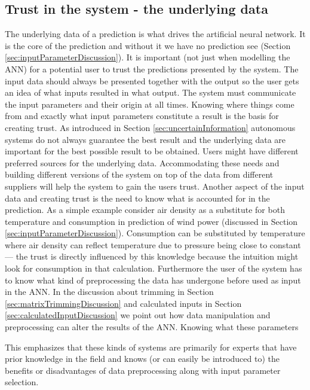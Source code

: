 \subsection{Trust in the system - the underlying data}
The underlying data of a prediction is what drives the artificial neural network. It is the core of the prediction and without it we have no prediction see (Section \ref{sec:inputParameterDiscussion}). It is important (not just when modelling the ANN) for a potential user to trust the predictions presented by the system. The input data should always be presented together with the output so the user gets an idea of what inputs resulted in what output. The system must communicate the input parameters and their origin at all times. Knowing where things come from and exactly what input parameters constitute a result is the basis for creating trust. As introduced in Section \ref{sec:uncertainInformation} autonomous systems do not always guarantee the best result and the underlying data are important for the best possible result to be obtained. Users might have different preferred sources for the underlying data. Accommodating these needs and building different versions of the system on top of the data from different suppliers will help the system to gain the users trust. Another aspect of the input data and creating trust is the need to know what is accounted for in the prediction. As a simple example consider air density as a substitute for both temperature and consumption in prediction of wind power (discussed in Section \ref{sec:inputParameterDiscussion}). Consumption can be substituted by temperature where air density can reflect temperature due to pressure being close to constant --- the trust is directly influenced by this knowledge because the intuition might look for consumption in that calculation. Furthermore the user of the system has to know what kind of preprocessing the data has undergone before used as input in the ANN. In the discussion about trimming in Section \ref{sec:matrixTrimmingDiscussion} and calculated inputs in Section \ref{sec:calculatedInputDiscussion} we point out how data manipulation and preprocessing can alter the results of the ANN. Knowing what these parameters 


This emphasizes that these kinds of systems are primarily for experts that have prior knowledge in the field and knows (or can easily be introduced to) the benefits or disadvantages of data preprocessing along with input parameter selection.


